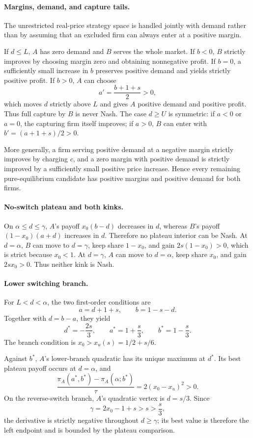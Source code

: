 \paragraph{Margins, demand, and capture tails.}
The unrestricted real-price strategy space is handled jointly with demand rather than by assuming that an excluded firm can always enter at a positive margin.

If \(d\le L\), \(A\) has zero demand and \(B\) serves the whole market. If \(b<0\), \(B\) strictly improves by choosing margin zero and obtaining nonnegative profit. If \(b=0\), a sufficiently small increase in \(b\) preserves positive demand and yields strictly positive profit. If \(b>0\), \(A\) can choose
\[
a'=\frac{b+1+s}{2}>0,
\]
which moves \(d\) strictly above \(L\) and gives \(A\) positive demand and positive profit. Thus full capture by \(B\) is never Nash. The case \(d\ge U\) is symmetric: if \(a<0\) or \(a=0\), the capturing firm itself improves; if \(a>0\), \(B\) can enter with \(b'=(a+1+s)/2>0\).

More generally, a firm serving positive demand at a negative margin strictly improves by charging \(c\), and a zero margin with positive demand is strictly improved by a sufficiently small positive price increase. Hence every remaining pure-equilibrium candidate has positive margins and positive demand for both firms.

\paragraph{No-switch plateau and both kinks.}
On \(\alpha\le d\le\gamma\), \(A\)'s payoff \(x_0(b-d)\) decreases in \(d\), whereas \(B\)'s payoff \((1-x_0)(a+d)\) increases in \(d\). Therefore no plateau interior can be Nash. At \(d=\alpha\), \(B\) can move to \(d=\gamma\), keep share \(1-x_0\), and gain \(2s(1-x_0)>0\), which is strict because \(x_0<1\). At \(d=\gamma\), \(A\) can move to \(d=\alpha\), keep share \(x_0\), and gain \(2sx_0>0\). Thus neither kink is Nash.

\paragraph{Lower switching branch.}
For \(L<d<\alpha\), the two first-order conditions are
\[
a=d+1+s,\qquad b=1-s-d.
\]
Together with \(d=b-a\), they yield
\[
d^*=-\frac{2s}{3},\qquad a^*=1+\frac{s}{3},\qquad b^*=1-\frac{s}{3}.
\]
The branch condition is \(x_0>x_u(s)=1/2+s/6\).

Against \(b^*\), \(A\)'s lower-branch quadratic has its unique maximum at \(d^*\). Its best plateau payoff occurs at \(d=\alpha\), and
\[
\frac{\pi_A(a^*,b^*)-\pi_A(\alpha;b^*)}{\tau}=2(x_0-x_u)^2>0.
\]
On the reverse-switch branch, \(A\)'s quadratic vertex is \(d=s/3\). Since
\[
\gamma=2x_0-1+s>s>\frac{s}{3},
\]
the derivative is strictly negative throughout \(d\ge\gamma\); its best value is therefore the left endpoint and is bounded by the plateau comparison.

